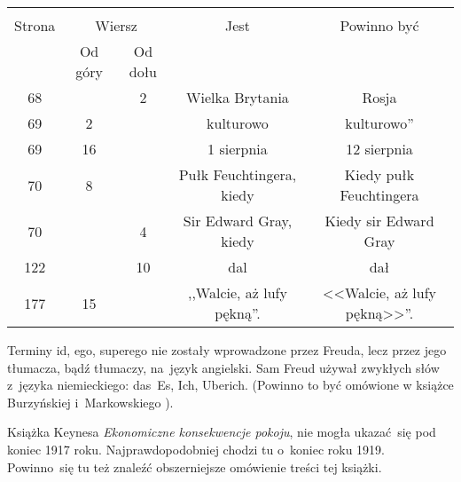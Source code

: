 \documentclass[a4paper,11pt]{article}
\begin{document}
\begin{center}
  \begin{tabular}{|c|c|c|c|c|}
    \hline
    & \multicolumn{2}{c|}{} & & \\
    Strona & \multicolumn{2}{c|}{Wiersz} & Jest
                              & Powinno być \\ \cline{2-3}
    & Od góry & Od dołu & & \\
    \hline
    68  & &  2 & Wielka Brytania & Rosja \\
    69  &  2 & & kulturowo & kulturowo'' \\
    69  & 16 & & 1 sierpnia & 12 sierpnia \\
    70  &  8 & & Pułk Feuchtingera, kiedy & Kiedy pułk Feuchtingera \\
    70  & &  4 & Sir Edward Gray, kiedy & Kiedy sir Edward Gray \\
    122 & & 10 & dal & dał \\
    177 & 15 & & ,,Walcie, aż lufy pękną''.
           & <<Walcie, aż lufy pękną>>''. \\
    \hline
  \end{tabular}
\end{center}

\vspace{\spaceTwo}








\start {} Terminy id, ego, superego nie zostały wprowadzone
przez Freuda, lecz przez jego tłumacza, bądź tłumaczy, na~język
angielski. Sam Freud używał zwykłych słów z~języka niemieckiego:
das~Es, Ich, Uberich. (Powinno to być omówione w książce Burzyńskiej
i~Markowskiego \cite{BM09}).

\vspace{\spaceFour}


\start {} Książka Keynesa \emph{Ekonomiczne konsekwencje
  pokoju}, nie mogła ukazać~się pod koniec 1917 roku.
Najprawdopodobniej chodzi tu o~koniec roku 1919. Powinno~się tu też
znaleźć obszerniejsze omówienie treści tej książki.
\end{document}
